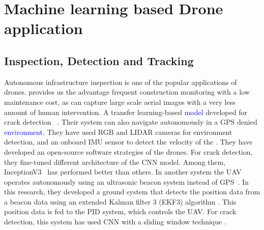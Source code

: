 \section{Machine learning based Drone application}
\label{applicationsection}


\subsection{Inspection, Detection and Tracking}
Autonomous infrastructure inspection is one of the popular applications of drones.  provides us the advantage  frequent construction monitoring with a low maintenance cost, as  can capture large scale aerial images with a very less amount of human intervention.
A transfer learning-based \textcolor{blue}{model}  developed for crack detection ~\cite{kucuksubasi2018transfer}.  Their system can also navigate autonomously in a GPS denied \textcolor{blue}{environment}. They have used RGB and LIDAR cameras for environment detection, and an onboard IMU sensor to detect the velocity of the . They have developed an open-source software  strategies of the drones. For crack detection, they fine\textcolor{blue}{-}tuned different architecture of the CNN model. Among them, InceptionV3~\cite{szegedy2016rethinking} has performed better than others.
In another system the UAV operates autonomously using an ultrasonic beacon system instead of GPS~\cite{kang2018autonomous}. In this research, they developed a ground system that detects the position data from a beacon data using an extended Kalman filter 3 (EKF3) algorithm \cite{willner1976kalman}. This position data is fed to the PID system, which controls the UAV. For crack detection, this system has used CNN with a sliding window technique \cite{cha2017deep}.

